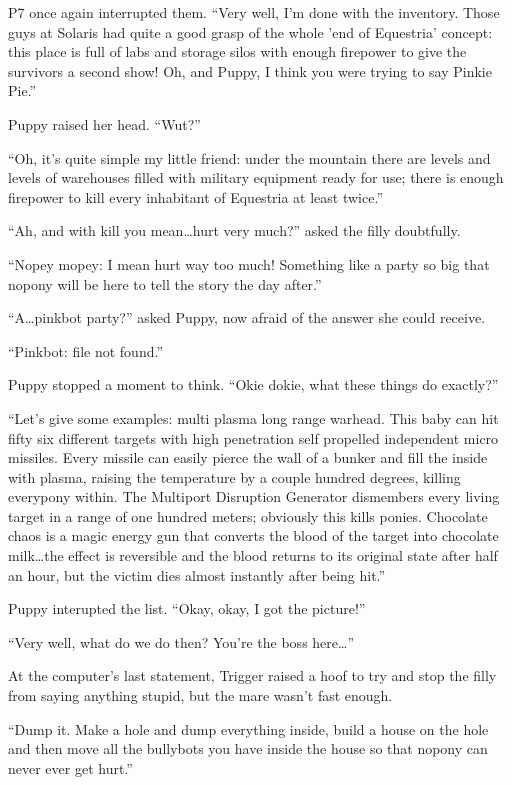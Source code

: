P7 once again interrupted them. ``Very well, I'm done with the inventory. Those guys at Solaris had quite a good grasp of the whole 'end of Equestria' concept: this place is full of labs and storage silos with enough firepower to give the survivors a second show! Oh, and Puppy, I think you were trying to say Pinkie Pie.''

Puppy raised her head. ``Wut?''

``Oh, it's quite simple my little friend: under the mountain there are levels and levels of warehouses filled with military equipment ready for use; there is enough firepower to kill every inhabitant of Equestria at least twice.''

``Ah, and with kill you mean\dots hurt very much?'' asked the filly doubtfully.

``Nopey mopey: I mean hurt way too much! Something like a party so big that nopony will be here to tell the story the day after.''

``A\dots pinkbot party?'' asked Puppy, now afraid of the answer she could receive.

``Pinkbot: file not found.''

Puppy stopped a moment to think. ``Okie dokie, what these things do exactly?''

``Let's give some examples: multi plasma long range warhead. This baby can hit fifty six different targets with high penetration self propelled independent micro missiles. Every missile can easily pierce the wall of a bunker and fill the inside with plasma, raising the temperature by a couple hundred degrees, killing everypony within. The Multiport Disruption Generator dismembers every living target in a range of one hundred meters; obviously this kills ponies. Chocolate chaos is a magic energy gun that converts the blood of the target into chocolate milk\dots the effect is reversible and the blood returns to its original state after half an hour, but the victim dies almost instantly after being hit.''

Puppy interupted the list. ``Okay, okay, I got the picture!''

``Very well, what do we do then? You're the boss here\dots''

At the computer's last statement, Trigger raised a hoof to try and stop the filly from saying anything stupid, but the mare wasn't fast enough.

``Dump it. Make a hole and dump everything inside, build a house on the hole and then move all the bullybots you have inside the house so that nopony can never ever get hurt.''

